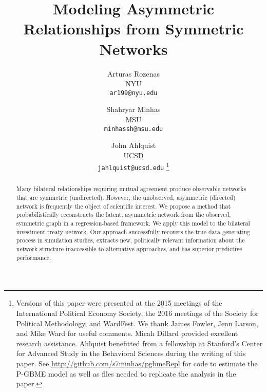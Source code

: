 \documentclass[a4paper, 12pt]{article}
\begin{document}
\title{{\bf Modeling Asymmetric Relationships from Symmetric Networks}}

\author{
  Arturas Rozenas\\
{\small NYU}\\
  {\small \texttt{ar199@nyu.edu}}
\and
  Shahryar Minhas\\
{\small MSU}\\
  {\small \texttt{minhassh@msu.edu}}
  \and
  John Ahlquist\\
{\small UCSD}\\
  {\small \texttt{jahlquist@ucsd.edu}}
\thanks{Versions of this paper were presented at the 2015 meetings of the International Political Economy Society, the 2016 meetings of the Society for Political Methodology, and WardFest.  We thank James Fowler, Jenn Larson, and Mike Ward for useful comments. Micah Dillard provided excellent research assistance.  Ahlquist benefitted from a fellowship at Stanford's Center for Advanced Study in the Behavioral Sciences during the writing of this paper.  See \url{http://github.com/s7minhas/pgbmeRepl} for code to estimate the P-GBME model as well as files needed to replicate the analysis in the paper.}}

\maketitle 
\thispagestyle{empty}

\bigskip

\begin{abstract}
 \noindent Many bilateral relationships requiring mutual agreement produce observable networks that are symmetric (undirected). However, the unobserved, asymmetric (directed) network is frequently the object of scientific interest. We propose a method that probabilistically reconstructs the latent, asymmetric network from the observed, symmetric graph in a regression-based framework. We apply this model to the bilateral investment treaty network. Our approach successfully recovers the true data generating process in simulation studies, extracts new, politically relevant information about the network structure inaccessible to alternative approaches, and has superior predictive performance. 
\end{abstract}

\clearpage

\singlespacing






\singlespacing


\end{document}
